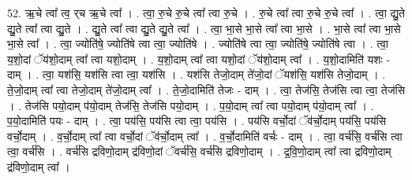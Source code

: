 \documentclass[17pt]{extarticle}
\begin{document}
52. ऋ॒चे त्वा᳚ त्व॒ र्‌च ऋ॒चे त्वा᳚ । . त्वा॒ रु॒चे रु॒चे त्वा᳚ त्वा रु॒चे । . रु॒चे त्वा᳚ त्वा रु॒चे रु॒चे त्वा᳚ । . त्वा॒ द्यु॒ते द्यु॒ते त्वा᳚ त्वा द्यु॒ते । . द्यु॒ते त्वा᳚ त्वा द्यु॒ते द्यु॒ते त्वा᳚ । . त्वा॒ भा॒से भा॒से त्वा᳚ त्वा भा॒से । . भा॒से त्वा᳚ त्वा भा॒से भा॒से त्वा᳚ । . त्वा॒ ज्योति॑षे॒ ज्योति॑षे त्वा त्वा॒ ज्योति॑षे । . ज्योति॑षे त्वा त्वा॒ ज्योति॑षे॒ ज्योति॑षे त्वा । . त्वा॒ य॒शो॒दां ॅय॑शो॒दाम् त्वा᳚ त्वा यशो॒दाम् । . य॒शो॒दाम् त्वा᳚ त्वा यशो॒दां ॅय॑शो॒दाम् त्वा᳚ । . य॒शो॒दामिति॑ यशः - दाम् । . त्वा॒ यश॑सि॒ यश॑सि त्वा त्वा॒ यश॑सि । . यश॑सि तेजो॒दाम् ते॑जो॒दां ॅयश॑सि॒ यश॑सि तेजो॒दाम् । . ते॒जो॒दाम् त्वा᳚ त्वा तेजो॒दाम् ते॑जो॒दाम् त्वा᳚ । . ते॒जो॒दामिति॑ तेजः - दाम् । . त्वा॒ तेज॑सि॒ तेज॑सि त्वा त्वा॒ तेज॑सि । . तेज॑सि पयो॒दाम् प॑यो॒दाम् तेज॑सि॒ तेज॑सि पयो॒दाम् । . प॒यो॒दाम् त्वा᳚ त्वा पयो॒दाम् प॑यो॒दाम् त्वा᳚ । . प॒यो॒दामिति॑ पयः - दाम् । . त्वा॒ पय॑सि॒ पय॑सि त्वा त्वा॒ पय॑सि । . पय॑सि वर्चो॒दां ॅव॑र्चो॒दाम् पय॑सि॒ पय॑सि वर्चो॒दाम् । . व॒र्चो॒दाम् त्वा᳚ त्वा वर्चो॒दां ॅव॑र्चो॒दाम् त्वा᳚ । . व॒र्चो॒दामिति॑ वर्चः - दाम् । . त्वा॒ वर्च॑सि॒ वर्च॑सि त्वा त्वा॒ वर्च॑सि । . वर्च॑सि द्रविणो॒दाम् द्र॑विणो॒दां ॅवर्च॑सि॒ वर्च॑सि द्रविणो॒दाम् । . द्र॒वि॒णो॒दाम् त्वा᳚ त्वा द्रविणो॒दाम् द्र॑विणो॒दाम् त्वा᳚ । \newline
\end{document}

